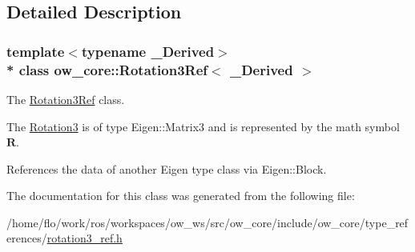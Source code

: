 \subsection{Detailed Description}
\subsubsection*{template$<$typename \+\_\+\+Derived$>$\\*
class ow\+\_\+core\+::\+Rotation3\+Ref$<$ \+\_\+\+Derived $>$}

The \hyperlink{classow__core_1_1Rotation3Ref}{Rotation3\+Ref} class. 

The \hyperlink{classow__core_1_1Rotation3}{Rotation3} is of type Eigen\+::\+Matrix3 and is represented by the math symbol $\mathbf{R}$.

References the data of another Eigen type class via Eigen\+::\+Block. 

The documentation for this class was generated from the following file\+:\begin{DoxyCompactItemize}
\item 
/home/flo/work/ros/workspaces/ow\+\_\+ws/src/ow\+\_\+core/include/ow\+\_\+core/type\+\_\+references/\hyperlink{rotation3__ref_8h}{rotation3\+\_\+ref.\+h}\end{DoxyCompactItemize}
